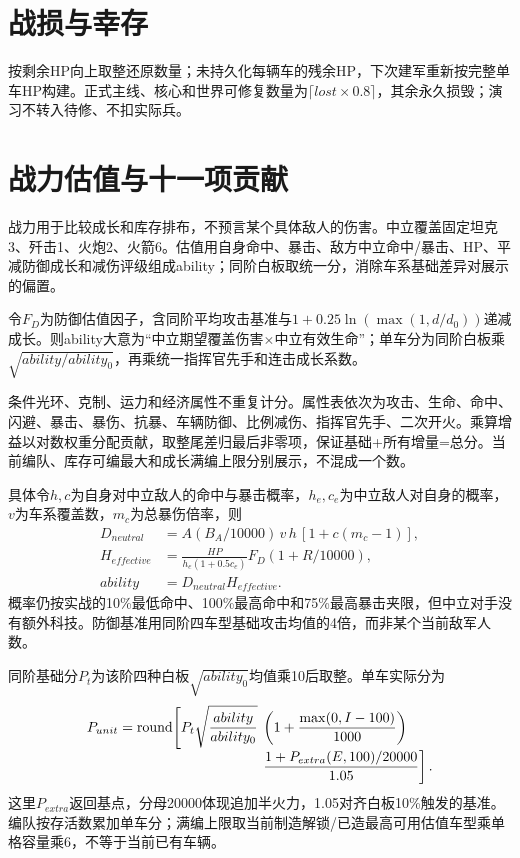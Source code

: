 \section{战损与幸存}
按剩余HP向上取整还原数量；未持久化每辆车的残余HP，下次建军重新按完整单车HP构建。正式主线、核心和世界可修复数量为\(\lceil lost\times0.8\rceil\)，其余永久损毁；演习不转入待修、不扣实际兵。

\section{战力估值与十一项贡献}
战力用于比较成长和库存排布，不预言某个具体敌人的伤害。中立覆盖固定坦克3、歼击1、火炮2、火箭6。估值用自身命中、暴击、敌方中立命中/暴击、HP、平减防御成长和减伤评级组成ability；同阶白板取统一分，消除车系基础差异对展示的偏置。

令\(F_D\)为防御估值因子，含同阶平均攻击基准与\(1+0.25\ln(\max(1,d/d_0))\)递减成长。则ability大意为“中立期望覆盖伤害\(\times\)中立有效生命”；单车分为同阶白板乘\(\sqrt{ability/ability_0}\)，再乘统一指挥官先手和连击成长系数。

条件光环、克制、运力和经济属性不重复计分。属性表依次为攻击、生命、命中、闪避、暴击、暴伤、抗暴、车辆防御、比例减伤、指挥官先手、二次开火。乘算增益以对数权重分配贡献，取整尾差归最后非零项，保证基础+所有增量=总分。当前编队、库存可编最大和成长满编上限分别展示，不混成一个数。

具体令\(h,c\)为自身对中立敌人的命中与暴击概率，\(h_e,c_e\)为中立敌人对自身的概率，\(v\)为车系覆盖数，\(m_c\)为总暴伤倍率，则
\begin{align}
D_{neutral}&=A(B_A/10000)\,v\,h\,[1+c(m_c-1)],\\
H_{effective}&=\frac{HP}{h_e(1+0.5c_e)}F_D(1+R/10000),\\
ability&=D_{neutral}H_{effective}.
\end{align}
概率仍按实战的10\%最低命中、100\%最高命中和75\%最高暴击夹限，但中立对手没有额外科技。防御基准用同阶四车型基础攻击均值的4倍，而非某个当前敌军人数。

同阶基础分\(P_t\)为该阶四种白板\(\sqrt{ability_0}\)均值乘10后取整。单车实际分为
\begin{align}
P_{unit}=\operatorname{round}\!\left[P_t\sqrt{\frac{ability}{ability_0}}\right.
&\left.\left(1+\frac{\max(0,I-100)}{1000}\right)\right.\notag\\[-3pt]
&\left.\frac{1+P_{extra}(E,100)/20000}{1.05}\right].
\end{align}
这里\(P_{extra}\)返回基点，分母20000体现追加半火力，1.05对齐白板10\%触发的基准。编队按存活数累加单车分；满编上限取当前制造解锁/已造最高可用估值车型乘单格容量乘6，不等于当前已有车辆。
